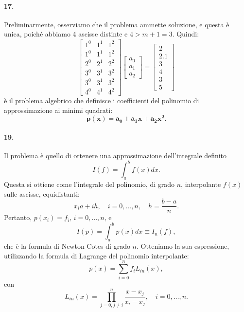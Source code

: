 \paragraph{17.} Preliminarmente, osserviamo che il problema ammette soluzione, e questa è unica, poiché abbiamo 4 ascisse distinte e $4>m+1=3$. Quindi:
\begin{equation*}
    \begin{bmatrix}
        1^0 & 1^1 & 1^2\\
        1^0 & 1^1 & 1^2\\
        2^0 & 2^1 & 2^2\\
        3^0 & 3^1 & 3^2\\
        3^0 & 3^1 & 3^2\\
        4^0 & 4^1 & 4^2
    \end{bmatrix}
    \begin{bmatrix}
        a_0\\
        a_1\\
        a_2
    \end{bmatrix}=
    \begin{bmatrix}
        2\\
        2.1\\
        3\\
        4\\
        3\\
        5
    \end{bmatrix}
\end{equation*}
è il problema algebrico che definisce i coefficienti del polinomio di approssimazione ai minimi quadrati:
\begin{equation*}
    \boldsymbol{p(x)=a_0+a_1x+a_2x^2}.
\end{equation*}

\paragraph{19.} Il problema è quello di ottenere una approssimazione dell'integrale definito
\begin{equation*}
    I(f)=\int_a^b f(x)dx.
\end{equation*}
Questa si ottiene come l'integrale del polinomio, di grado $n$, interpolante $f(x)$ sulle ascisse, equidistanti:
\begin{equation*}
    x_ia+ih,\quad i=0,\hdots, n,\quad h=\frac{b-a}{n}.
\end{equation*}
Pertanto, $p(x_i)=f_i,\, i=0,\hdots,n$, e
\begin{equation*}
    I(p)=\int_a^b p(x)dx\equiv I_n(f),
\end{equation*}
che è la formula di Newton-Cotes di grado $n$. Otteniamo la sua espressione, utilizzando la formula di Lagrange del polinomio interpolante:
\begin{equation*}
    p(x)=\sum_{i=0}^n f_iL_{in}(x),
\end{equation*}
con
\begin{equation*}
    L_{in}(x)=\prod_{j=0, j\neq i}^n \frac{x-x_j}{x_i-x_j},\quad i=0,\hdots, n.
\end{equation*}

